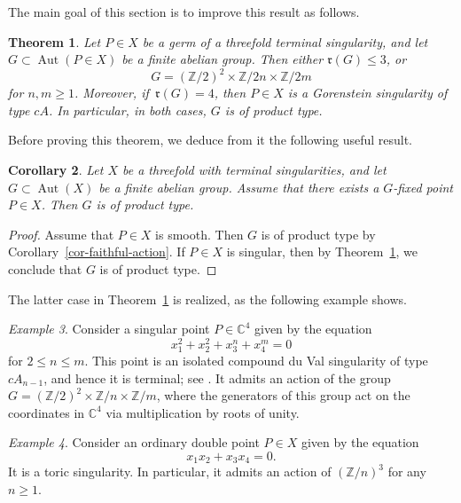 \documentclass[11pt]{amsart}
\numberwithin{equation}{section}
\newtheorem{thm}{Theorem}[section]
\newtheorem{corollary}[thm]{Corollary}
\theoremstyle{definition}
\theoremstyle{remark}
\newtheorem{example}[thm]{Example}
\DeclareMathOperator{\Aut}{Aut}
\begin{document}
The main goal of this section is to improve this result as follows.

\begin{thm}
\label{thm-action-on-terminal-point}
Let $P\in X$ be a germ of a threefold terminal singularity, and let $G \subset \Aut(P\in X)$ be a finite abelian group. Then either $\mathfrak{r}(G)\leq 3$, or
\[
G= (\mathbb{Z}/2)^2\times\mathbb{Z}/2n\times\mathbb{Z}/2m
\]
for $n,m\geq 1$. 
Moreover, if\, $\mathfrak{r}(G)=4$, then $P\in X$ is a Gorenstein singularity of type $cA$. In particular, in both cases, $G$ is of product type.
\end{thm}

Before proving this theorem, we deduce from it the following useful result. 

\begin{corollary}
\label{cor-fixed-point}
Let $X$ be a threefold with terminal singularities, and let $G\subset \Aut(X)$ be a finite abelian group. 
Assume that there exists a $G$-fixed point $P\in X$. Then $G$ is of product type.
\end{corollary}

\begin{proof}
Assume that $P\in X$ is smooth. Then $G$ is of product type by Corollary~\ref{cor-faithful-action}.  If $P\in X$ is singular, then by Theorem~\ref{thm-action-on-terminal-point}, we conclude that $G$ is of product type.
\end{proof}

The latter case in Theorem~\ref{thm-action-on-terminal-point} is realized, as the following example shows.

\begin{example}
\label{ex-maximal-terminal-action}
Consider a singular point $P\in \mathbb{C}^4$ given by the equation
\[
x_1^2 + x_2^2 + x_3^{n} + x_4^{m} = 0 
\]
for $2\leq n\leq m$. This point is an isolated compound du Val singularity of type $cA_{n-1}$, and hence it is terminal; see \cite{KS-B88}. It admits an action of the group $G=(\mathbb{Z}/2)^2\times\mathbb{Z}/n\times\mathbb{Z}/m$, where the generators of this group act on the coordinates in $\mathbb{C}^4$ via multiplication by roots of unity.
\end{example}

\begin{example}
Consider an ordinary double point $P\in X$ given by the equation
\[
x_1 x_2 + x_3 x_4 = 0.
\]
It is a toric singularity. In particular, it admits an action of $(\mathbb{Z}/n)^3$ for any $n\geq 1$.
\end{example}
\end{document}
